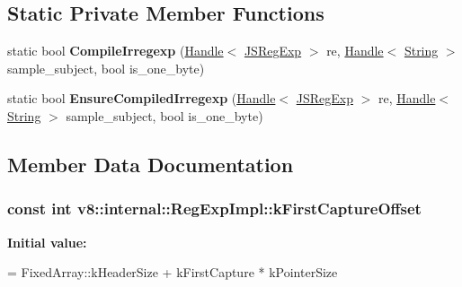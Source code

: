 \subsection*{Static Private Member Functions}
\begin{DoxyCompactItemize}
\item 
static bool {\bfseries Compile\+Irregexp} (\hyperlink{classv8_1_1internal_1_1_handle}{Handle}$<$ \hyperlink{classv8_1_1internal_1_1_j_s_reg_exp}{J\+S\+Reg\+Exp} $>$ re, \hyperlink{classv8_1_1internal_1_1_handle}{Handle}$<$ \hyperlink{classv8_1_1internal_1_1_string}{String} $>$ sample\+\_\+subject, bool is\+\_\+one\+\_\+byte)\hypertarget{classv8_1_1internal_1_1_reg_exp_impl_a2f0de41d3c31ba81b04deae4a0260642}{}\label{classv8_1_1internal_1_1_reg_exp_impl_a2f0de41d3c31ba81b04deae4a0260642}

\item 
static bool {\bfseries Ensure\+Compiled\+Irregexp} (\hyperlink{classv8_1_1internal_1_1_handle}{Handle}$<$ \hyperlink{classv8_1_1internal_1_1_j_s_reg_exp}{J\+S\+Reg\+Exp} $>$ re, \hyperlink{classv8_1_1internal_1_1_handle}{Handle}$<$ \hyperlink{classv8_1_1internal_1_1_string}{String} $>$ sample\+\_\+subject, bool is\+\_\+one\+\_\+byte)\hypertarget{classv8_1_1internal_1_1_reg_exp_impl_aeae5de03045ff0978bffd702242676e8}{}\label{classv8_1_1internal_1_1_reg_exp_impl_aeae5de03045ff0978bffd702242676e8}

\end{DoxyCompactItemize}


\subsection{Member Data Documentation}
\subsubsection[{\texorpdfstring{k\+First\+Capture\+Offset}{kFirstCaptureOffset}}]{\setlength{\rightskip}{0pt plus 5cm}const int v8\+::internal\+::\+Reg\+Exp\+Impl\+::k\+First\+Capture\+Offset\hspace{0.3cm}{\ttfamily [static]}}\hypertarget{classv8_1_1internal_1_1_reg_exp_impl_af1659259f1274cc603b5761d15c69fdb}{}\label{classv8_1_1internal_1_1_reg_exp_impl_af1659259f1274cc603b5761d15c69fdb}
{\bfseries Initial value\+:}
\begin{DoxyCode}
=
      FixedArray::kHeaderSize + kFirstCapture * kPointerSize
\end{DoxyCode}
